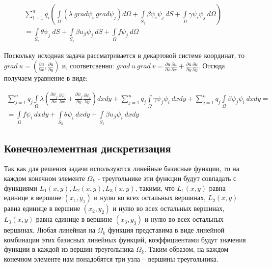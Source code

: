 \documentclass[12pt,a4paper]{article}
\begin{document}
\begin{eqnarray*}
    \sum \limits_{i=1}^n q_i \left(
        \int \limits_{\Omega} (\lambda \ grad \psi_i \ grad \psi_j) d\Omega
        + \int \limits_{S_3} \beta \psi_i \psi_j \ dS
        + \int \limits_{\Omega} \gamma \psi_i \psi_j \ d\Omega
    \right)
    = \\
    =
    \int \limits_{S_2} \theta \psi_j \ dS
    + \int \limits_{S_3} \beta u_{\beta} \psi_j \ dS
    + \int \limits_{\Omega} f \psi_j \ d\Omega
\end{eqnarray*}


\begin{spacing}{1.25}
    \noindent Поскольку исходная задача рассматривается в
    декартовой системе координат, то
    $grad \ u = \left( \frac{\partial u}{\partial x}, \frac{\partial u}{\partial y} \right)$
    и, соответсвенно:
    $
    grad \ u \ grad \ v =
    \frac{\partial u}{\partial x}
    \frac{\partial u}{\partial x}
    +
    \frac{\partial u}{\partial y}
    \frac{\partial u}{\partial y}
    $.
    Отсюда получаем уравнение в виде:
\end{spacing}


\begin{eqnarray*}
    \sum \limits_{j=1}^n q_j \int \limits_{\Omega}
    \lambda \left(
        \frac{\partial \psi_j}{\partial x} \frac{\partial \psi_i}{\partial x}
        +
        \frac{\partial \psi_j}{\partial y} \frac{\partial \psi_i}{\partial y}
    \right)
    dxdy
    +
    \sum \limits_{j=1}^n q_j \int \limits_{\Omega}
    \gamma \psi_j \psi_i \ dxdy
    +
    \sum \limits_{j=1}^n q_j \int \limits_{\Omega}
    \beta \psi_j \psi_i \ dxdy
    = \\
    =
    \int \limits_{\Omega} f \psi_i \ dxdy
    +
    \int \limits_{S_2} \theta \psi_i \ dxdy
    +
    \int \limits_{S_3} \beta u_{\beta} \psi_i \ dxdy
\end{eqnarray*}


\subsection*{Конечноэлементная дискретизация}

Так как для решения задачи используются линейные базисные
функции, то на каждом конечном элементе $\Omega_k$ -
треугольнике эти функции будут совпадать с функциями
$L_1(x,y), L_2(x,y), L_3(x,y)$, такими, что $L_1(x,y)$
равна единице в вершине $(x_1,y_1)$ и нулю во всех остальных
вершинах, $L_2(x,y)$ равна единице в вершине $(x_2,y_2)$
и нулю во всех остальных вершинах, $L_3(x,y)$ равна единице
в вершине $(x_3,y_3)$ и нулю во всех остальных вершинах.
Любая линейная на $\Omega_k$ функция представима в виде
линейной комбинации этих базисных линейных функций,
коэффициентами будут значения функции в каждой из вершин
треугольника $\Omega_k$. Таким образом, на каждом конечном
элементе нам понадобятся три узла – вершины треугольника.
\end{document}
